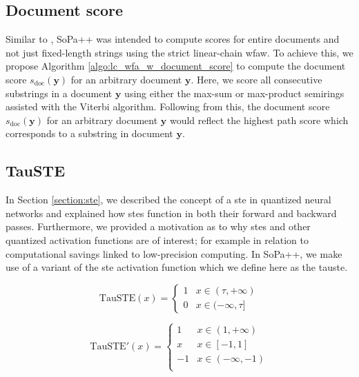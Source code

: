 \subsection{Document score}

Similar to \citet{schwartz2018sopa}, SoPa++ was intended to compute scores for
entire documents and not just fixed-length strings using the strict linear-chain
\ac{wfaw}. To achieve this, we propose Algorithm
\ref{algo:lc_wfa_w_document_score} to compute the document score
$s_{\text{doc}}(\bm{y})$ for an arbitrary document $\bm{y}$. Here, we score all
consecutive substrings in a document $\bm{y}$ using either the max-sum or
max-product semirings assisted with the Viterbi algorithm. Following from this,
the document score $s_{\text{doc}}(\bm{y})$ for an arbitrary document $\bm{y}$
would reflect the highest path score which corresponds to a substring in
document $\bm{y}$.

\subsection{TauSTE}

In Section \ref{section:ste}, we described the concept of a \ac{ste} in quantized
neural networks and explained how \ac{ste}s function in both their forward and
backward passes. Furthermore, we provided a motivation as to why \ac{ste}s and other
quantized activation functions are of interest; for example in relation to
computational savings linked to low-precision computing. In SoPa++, we make use
of a variant of the \ac{ste} activation function which we define here as the \ac{tauste}.

\begin{equation}
  \label{eq:tau_ste_forward}
  \text{TauSTE}(x)=
  \begin{cases}
    1 & x \in (\tau, +\infty) \\
    0 & x \in (-\infty, \tau]
  \end{cases}
\end{equation}

\begin{equation}
  \label{eq:tau_ste_backward}
  \text{TauSTE}'(x)=
  \begin{cases}
    1 & x \in  (1, +\infty) \\
    x & x \in [-1, 1] \\
    -1 & x \in (-\infty, -1) \\
  \end{cases}
\end{equation}

